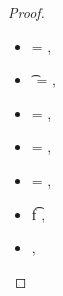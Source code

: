 \begin{lemma}
\begin{proof}
\begin{case}[T-App]
  \begin{itemize}
    \item
  \e{} = { {}},
    \item
  \t{} = {
                      {}
                      {\x{}}},
    \item
  {\thenprop {\prop{}}} = 
                 {
                              {}
                              {\x{}}},
    \item
  {\elseprop {\prop{}}} = 
                 {
                              {}
                              {\x{}}},
    \item
  \object{} = {
                           {}
                           {\x{}}},
    \item
  \judgement {\propenv{}} { {\ArrowOne {\x{}} {\s{}}
                                                       {\t{f}}
                                                       {
                                                                   {}}
                                                       {}}}
                {
                            {}}
                {},
    \item
  \judgement {\propenv{}}
                 { {\s{}}}
                 {
                             {}}
                 {},
  \end{itemize}

\end{case}
\end{proof}
\end{lemma}
